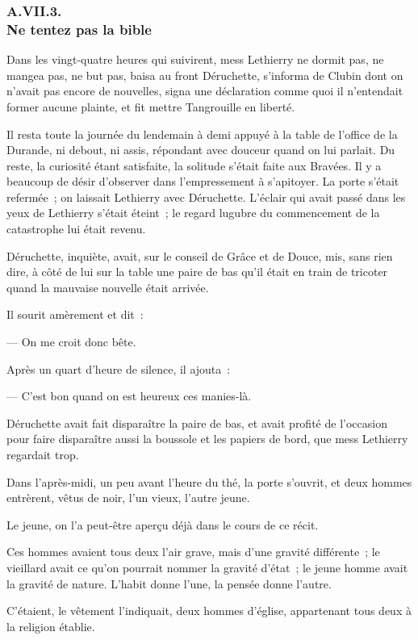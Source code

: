 \documentclass[french,twoside]{book} %
\begin{document}
 \subsubsection[{A.VII.3. Ne tentez pas la bible}]{A.VII.3. \\
Ne tentez pas la bible}
\noindent Dans les vingt-quatre heures qui suivirent, mess Lethierry ne dormit pas, ne mangea pas, ne but pas, baisa au front Déruchette, s’informa de Clubin dont on n’avait pas encore de nouvelles, signa une déclaration comme quoi il n’entendait former aucune plainte, et fit mettre Tangrouille en liberté.\par
Il resta toute la journée du lendemain à demi appuyé à la table de l’office de la Durande, ni debout, ni assis, répondant avec douceur quand on lui parlait. Du reste, la curiosité étant satisfaite, la solitude s’était faite aux Bravées. Il y a beaucoup de désir d’observer dans l’empressement à s’apitoyer. La porte s’était refermée ; on laissait Lethierry avec Déruchette. L’éclair qui avait passé dans les yeux de Lethierry s’était éteint ; le regard lugubre du commencement de la catastrophe lui était revenu.\par
Déruchette, inquiète, avait, sur le conseil de Grâce et de Douce, mis, sans rien dire, à côté de lui sur la  table une paire de bas qu’il était en train de tricoter quand la mauvaise nouvelle était arrivée.\par
Il sourit amèrement et dit :\par
— On me croit donc bête.\par
Après un quart d’heure de silence, il ajouta :\par
— C’est bon quand on est heureux ces manies-là.\par
Déruchette avait fait disparaître la paire de bas, et avait profité de l’occasion pour faire disparaître aussi la boussole et les papiers de bord, que mess Lethierry regardait trop.\par
Dans l’après-midi, un peu avant l’heure du thé, la porte s’ouvrit, et deux hommes entrèrent, vêtus de noir, l’un vieux, l’autre jeune.\par
Le jeune, on l’a peut-être aperçu déjà dans le cours de ce récit.\par
Ces hommes avaient tous deux l’air grave, mais d’une gravité différente ; le vieillard avait ce qu’on pourrait nommer la gravité d’état ; le jeune homme avait la gravité de nature. L’habit donne l’une, la pensée donne l’autre.\par
C’étaient, le vêtement l’indiquait, deux hommes d’église, appartenant tous deux à la religion établie.\par
\end{document}
